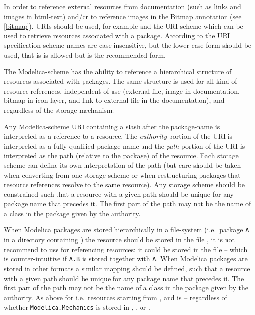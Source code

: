 In order to reference external resources from documentation (such as
links and images in html-text) and/or to reference images in the Bitmap
annotation (see \cref{bitmap}). URIs should be used, for example
 and the URI scheme  which can be used to retrieve
resources associated with a package. According to the URI specification scheme names are
case-insensitive, but the lower-case form should be used, that is  is allowed but  is the
recommended form.

The Modelica-scheme has the ability to reference a hierarchical
structure of resources associated with packages. The same structure is
used for all kind of resource references, independent of use (external
file, image in documentation, bitmap in icon layer, and link to external
file in the documentation), and regardless of the storage mechanism.

Any Modelica-scheme URI containing a slash after the package-name is
interpreted as a reference to a resource. The \emph{authority} portion of the
URI is interpreted as a fully qualified package name and the \emph{path}
portion of the URI is interpreted as the path (relative to the package)
of the resource. Each storage scheme can define its own interpretation
of the path (but care should be taken when converting from one storage
scheme or when restructuring packages that resource references resolve
to the same resource). Any storage scheme should be constrained such
that a resource with a given path should be unique for any package name
that precedes it. The first part of the path may not be the name of a
class in the package given by the authority.

When Modelica packages are stored hierarchically in a file-system (i.e.\ package \lstinline!A! in a directory  containing ) the resource
 should be stored in the file , it is not recommend to use  for referencing
resources; it could be stored in the file  -- which is counter-intuitive if \lstinline!A.B! is stored together with \lstinline!A!.  When Modelica packages
are stored in other formats a similar mapping should be defined, such that a resource with a given path should be unique for any package name that precedes it.  The first
part of the path may not be the name of a class in the package given by the authority.  As above for  i.e.\ resources starting from
, and  is  -- regardless of whether \lstinline!Modelica.Mechanics!
is stored in , , or .

